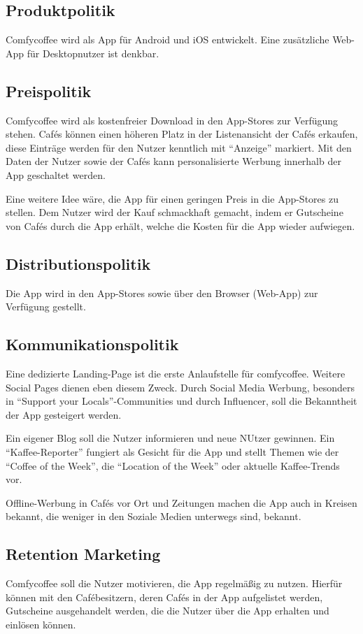 \subsection{Produktpolitik}
Comfycoffee wird als App für Android und iOS entwickelt. Eine zusätzliche Web-App für Desktopnutzer ist denkbar.

\subsection{Preispolitik}
Comfycoffee wird als kostenfreier Download in den App-Stores zur Verfügung stehen. Cafés können einen höheren Platz in der Listenansicht der Cafés erkaufen, diese Einträge werden für den Nutzer kenntlich mit ``Anzeige'' markiert. Mit den Daten der Nutzer sowie der Cafés kann personalisierte Werbung innerhalb der App geschaltet werden.

Eine weitere Idee wäre, die App für einen geringen Preis in die App-Stores zu stellen. Dem Nutzer wird der Kauf schmackhaft gemacht, indem er Gutscheine von Cafés durch die App erhält, welche die Kosten für die App wieder aufwiegen.

\subsection{Distributionspolitik}
Die App wird in den App-Stores sowie über den Browser (Web-App) zur Verfügung gestellt.

\subsection{Kommunikationspolitik}
Eine dedizierte Landing-Page ist die erste Anlaufstelle für comfycoffee. Weitere Social Pages dienen eben diesem Zweck. Durch Social Media Werbung, besonders in ``Support your Locals''-Communities und durch Influencer, soll die Bekanntheit der App gesteigert werden.

Ein eigener Blog soll die Nutzer informieren und neue NUtzer gewinnen. Ein ``Kaffee-Reporter'' fungiert als Gesicht für die App und stellt Themen wie der ``Coffee of the Week'', die ``Location of the Week'' oder aktuelle Kaffee-Trends vor.

Offline-Werbung in Cafés vor Ort und Zeitungen machen die App auch in Kreisen bekannt, die weniger in den Soziale Medien unterwegs sind, bekannt.

\subsection{Retention Marketing}
Comfycoffee soll die Nutzer motivieren, die App regelmäßig zu nutzen. Hierfür können mit den Cafébesitzern, deren Cafés in der App aufgelistet werden, Gutscheine ausgehandelt werden, die die Nutzer über die App erhalten und einlösen können.

